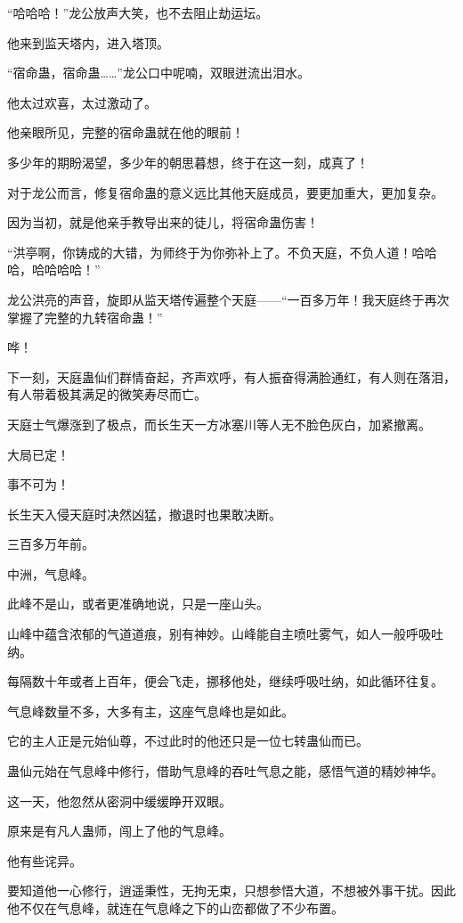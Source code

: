 \begin{this_body}
“哈哈哈！”龙公放声大笑，也不去阻止劫运坛。

他来到监天塔内，进入塔顶。

“宿命蛊，宿命蛊……”龙公口中呢喃，双眼迸流出泪水。

他太过欢喜，太过激动了。

他亲眼所见，完整的宿命蛊就在他的眼前！

多少年的期盼渴望，多少年的朝思暮想，终于在这一刻，成真了！

对于龙公而言，修复宿命蛊的意义远比其他天庭成员，要更加重大，更加复杂。

因为当初，就是他亲手教导出来的徒儿，将宿命蛊伤害！

“洪亭啊，你铸成的大错，为师终于为你弥补上了。不负天庭，不负人道！哈哈哈，哈哈哈哈！”

龙公洪亮的声音，旋即从监天塔传遍整个天庭——“一百多万年！我天庭终于再次掌握了完整的九转宿命蛊！”

哗！

下一刻，天庭蛊仙们群情奋起，齐声欢呼，有人振奋得满脸通红，有人则在落泪，有人带着极其满足的微笑寿尽而亡。

天庭士气爆涨到了极点，而长生天一方冰塞川等人无不脸色灰白，加紧撤离。

大局已定！

事不可为！

长生天入侵天庭时决然凶猛，撤退时也果敢决断。

三百多万年前。

中洲，气息峰。

此峰不是山，或者更准确地说，只是一座山头。

山峰中蕴含浓郁的气道道痕，别有神妙。山峰能自主喷吐雾气，如人一般呼吸吐纳。

每隔数十年或者上百年，便会飞走，挪移他处，继续呼吸吐纳，如此循环往复。

气息峰数量不多，大多有主，这座气息峰也是如此。

它的主人正是元始仙尊，不过此时的他还只是一位七转蛊仙而已。

蛊仙元始在气息峰中修行，借助气息峰的吞吐气息之能，感悟气道的精妙神华。

这一天，他忽然从密洞中缓缓睁开双眼。

原来是有凡人蛊师，闯上了他的气息峰。

他有些诧异。

要知道他一心修行，逍遥秉性，无拘无束，只想参悟大道，不想被外事干扰。因此他不仅在气息峰，就连在气息峰之下的山峦都做了不少布置。


\end{this_body}
